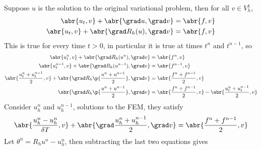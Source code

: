 \documentclass[11pt, titlepage]{article}
\begin{document}
\begin{enumerate}
    Suppose $u$ is the solution to the original variational problem, then
    for all $v \in V^1_h$,
    \begin{align*}
      \abr{u_t, v} + \abr{\grad u, \grad v} &= \abr{f, v} \\
      \abr{u_t, v} + \abr{\grad R_h(u), \grad v} &= \abr{f, v} \\
    \end{align*}
    This is true for every time $t > 0$, in particular it is true at times
    $t^n$ and $t^{n-1}$, so
    \begin{align*}
      \abr{u^n_t, v} + \abr{\grad R_h(u^n), \grad v} &= \abr{f^n, v} \\
      \abr{u^{n-1}_t, v} + \abr{\grad R_h(u^{n-1}), \grad v} &= \abr{f^{n-1}, v} \\
      \abr{\frac{u^n_t + u^{n-1}_t}{2}, v} + \abr{\grad R_h\p{\frac{u^n + u^{n-1}}{2}}, \grad v} &= \abr{\frac{f^n + f^{n-1}}{2}, v} \\
      \abr{\grad R_h\p{\frac{u^n + u^{n-1}}{2}}, \grad v} &= \abr{\frac{f^n + f^{n-1}}{2}, v} - \abr{\frac{u^n_t + u^{n-1}_t}{2}, v}\\
    \end{align*}
    Consider $u^n_h$ and $u^{n-1}_h$, solutions to the FEM, they satisfy
    \[
      \abr{\frac{u^n_h - u^n_h}{\delta T}, v} + 
      \abr{\grad \frac{u_h^n + u_h^{n-1}}{2}, \grad v} = 
      \abr{\frac{f^n + f^{n-1}}{2}, v} 
    \]
    Let $\theta^n = R_h u^n - u^n_h$, then subtracting the last two equations
    gives
    \begin{align*}
      
    \end{align*}

\end{enumerate}
\end{document}
